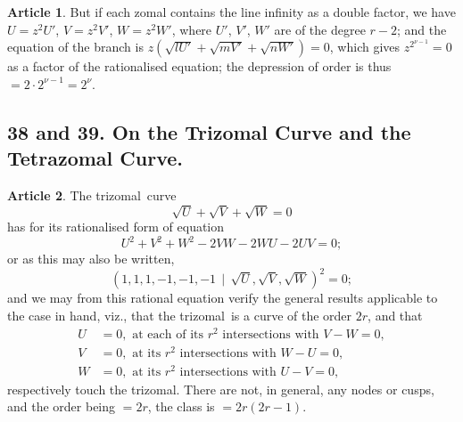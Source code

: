 \documentclass[11pt,a4paper]{article}
\theoremstyle{definition}
\newtheorem{art}{Article}
\newcommand{\trizomal}{trizomal}
\newcommand{\weighted}{\mathbin{\mid}}
\begin{document}
\begin{art}
But if each zomal contains the line infinity as a double factor, we have $U = z^{2}U'$, $V = z^{2}V'$, $W = z^{2}W'$, where $U'$, $V'$, $W'$ are of the degree $r - 2$; and the equation of the branch is $z(\sqrt{lU'} + \sqrt{mV'} + \sqrt{nW'}) = 0$, which gives $z^{2^{\nu-1}} = 0$ as a factor of the rationalised equation; the depression of order is thus $= 2 \cdot 2^{\nu-1} = 2^{\nu}$.
\end{art}



\subsection*{38 and 39. On the Trizomal Curve and the Tetrazomal Curve.}

\begin{art}
The \trizomal\ curve
\[
\sqrt{U} + \sqrt{V} + \sqrt{W} = 0
\]
has for its rationalised form of equation
\[
U^{2} + V^{2} + W^{2} - 2VW - 2WU - 2UV = 0;
\]
or as this may also be written,
\[
(1, 1, 1, -1, -1, -1 \,\weighted\, \sqrt{U}, \sqrt{V}, \sqrt{W})^{2} = 0;
\]
and we may from this rational equation verify the general results applicable to the case in hand, viz., that the \trizomal\ is a curve of the order $2r$, and that
\begin{align*}
U &= 0, \text{ at each of its } r^{2} \text{ intersections with } V - W = 0, \\
V &= 0, \text{ at its } r^{2} \text{ intersections with } W - U = 0, \\
W &= 0, \text{ at its } r^{2} \text{ intersections with } U - V = 0,
\end{align*}
respectively touch the \trizomal. There are not, in general, any nodes or cusps, and the order being $= 2r$, the class is $= 2r(2r - 1)$.
\end{art}
\end{document}
